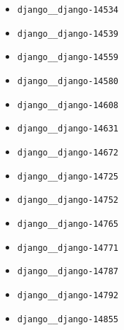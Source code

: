 \begin{multicols}{2}
\begin{itemize}
    \item \texttt{django\_\_django-14534}
    \item \texttt{django\_\_django-14539}
    \item \texttt{django\_\_django-14559}
    \item \texttt{django\_\_django-14580}
    \item \texttt{django\_\_django-14608}
    \item \texttt{django\_\_django-14631}
    \item \texttt{django\_\_django-14672}
    \item \texttt{django\_\_django-14725}
    \item \texttt{django\_\_django-14752}
    \item \texttt{django\_\_django-14765}
    \item \texttt{django\_\_django-14771}
    \item \texttt{django\_\_django-14787}
    \item \texttt{django\_\_django-14792}
    \item \texttt{django\_\_django-14855}
\end{itemize}
\end{multicols}